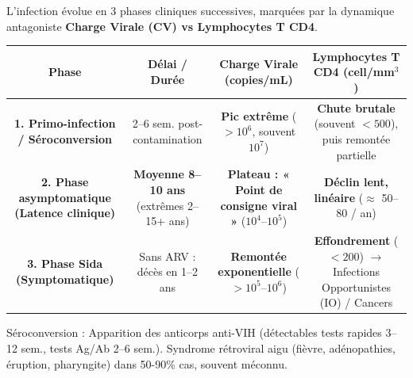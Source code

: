\documentclass[11pt]{article}
\newcommand{\cle}[1]{{\popxbold\color{popdark}#1}}
\begin{document}
\begin{definition}
L'infection évolue en 3 phases cliniques successives, marquées par la dynamique antagoniste \textbf{Charge Virale (CV) vs Lymphocytes T CD4}.
\begin{center}
\begin{tabular}{|c|c|c|c|}\hline
\textbf{Phase} & \textbf{Délai / Durée} & \textbf{Charge Virale (copies/mL)} & \textbf{Lymphocytes T CD4 (cell/mm$^3$)} \\ \hline
\textbf{1. Primo-infection / Séroconversion} & 2--6 sem. post-contamination & \textbf{Pic extrême} ($> 10^6$, souvent $10^7$) & \textbf{Chute brutale} (souvent $< 500$), puis remontée partielle \\ \hline
\textbf{2. Phase asymptomatique (Latence clinique)} & \textbf{Moyenne 8--10 ans} (extrêmes 2--15+ ans) & \textbf{Plateau : « Point de consigne viral »} ($10^4$--$10^5$) & \textbf{Déclin lent, linéaire} ($\approx$ 50--80 / an) \\ \hline
\textbf{3. Phase Sida (Symptomatique)} & Sans ARV : décès en 1--2 ans & \textbf{Remontée exponentielle} ($> 10^5$--$10^6$) & \textbf{Effondrement} ($< 200$) $\rightarrow$ Infections Opportunistes (IO) / Cancers \\ \hline
\end{tabular}
\end{center}
\cle{Séroconversion :} Apparition des anticorps anti-VIH (détectables tests rapides 3--12 sem., tests Ag/Ab 2--6 sem.). Syndrome rétroviral aigu (fièvre, adénopathies, éruption, pharyngite) dans 50-90\% cas, souvent méconnu.
\end{definition}
\end{document}
